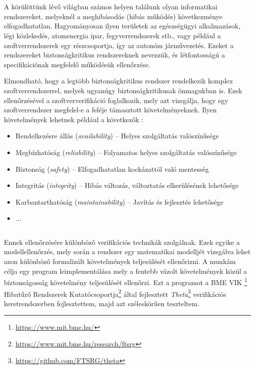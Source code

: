 \chapter{\bevezetes}

A körülöttünk lévő világban számos helyen találunk olyan informatikai rendszereket, melyeknél a meghibásodás (hibás működés) következménye elfogadhatatlan. Hagyományosan ilyen területek az egészségügyi alkalmazások, légi közlekedés, atomenergia ipar, fegyverrendszerek stb., vagy például a szoftverrendszerek egy részcsoportja, így az autonóm járművezetés. Ezeket a rendszereket biztonságkritikus rendszereknek nevezzük, és létfontosságú a specifikációnak megfelelő működésük ellenőrzése.

Elmondható, hogy a legtöbb biztonságkritikus rendszer rendelkezik komplex szoftverrendszerrel, melyek ugyanúgy biztonságkritikusak önmagukban is. Ezek ellenőrzésével a szoftververifikáció foglalkozik, mely azt vizsgálja, hogy egy szoftverrendszer megfelel-e a feléje támasztott követelményeknek. Ilyen követelmények lehetnek például a következők \cite{alapfogalmak}:
\begin{itemize}
	\item Rendelkezésre állás (\emph{availability}) -- Helyes szolgáltatás valószínűsége
	\item Megbízhatóság (\emph{reliability}) -- Folyamatos helyes szolgáltatás valószínűsége
	\item Biztonság (\emph{safety}) -- Elfogadhatatlan kockázattól való mentesség
	\item Integritás (\emph{integrity}) -- Hibás változás, változtatás elkerülésének lehetősége
	\item Karbantarthatóság (\emph{maintainability}) -- Javítás és fejlesztés lehetősége
	\item $\dots$
\end{itemize}
\ \\
Ennek ellenőrzésére különböző verifikációs technikák szolgálnak. Ezek egyike a modellellenőrzés, mely során a rendszer egy matematikai modelljét vizsgálva lehet azon különböző formalizált követelmények teljesülését ellenőrizni.
\newline
\newline
A munkám célja egy program leimplementálása mely a fentebb vázolt követelmények közül a biztonságosság követelmény teljesülését ellenőrzi. Ezt a programot a BME VIK \bmemit\footnote{\url{https://www.mit.bme.hu/}} Hibatűrő Rendszerek Kutatócsoportja\footnote{\url{https://www.mit.bme.hu/research/ftsrg}} által fejlesztett \emph{Theta}\footnote{\url{https://github.com/FTSRG/theta}} verifikációs keretrendszerben fejlesztettem, majd azt széleskörűen teszteltem.
